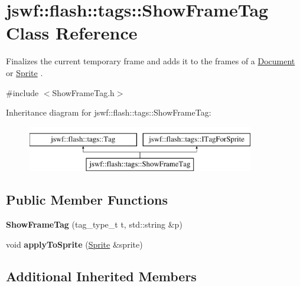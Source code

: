 \hypertarget{classjswf_1_1flash_1_1tags_1_1_show_frame_tag}{\section{jswf\+:\+:flash\+:\+:tags\+:\+:Show\+Frame\+Tag Class Reference}
\label{classjswf_1_1flash_1_1tags_1_1_show_frame_tag}
}


Finalizes the current temporary frame and adds it to the {\ttfamily frames} of a \hyperlink{classjswf_1_1flash_1_1_document}{Document} or \hyperlink{classjswf_1_1flash_1_1_sprite}{Sprite} .  




{\ttfamily \#include $<$Show\+Frame\+Tag.\+h$>$}

Inheritance diagram for jswf\+:\+:flash\+:\+:tags\+:\+:Show\+Frame\+Tag\+:\begin{figure}[H]
\begin{center}
\leavevmode
\includegraphics[height=2.000000cm]{classjswf_1_1flash_1_1tags_1_1_show_frame_tag}
\end{center}
\end{figure}
\subsection*{Public Member Functions}
\begin{DoxyCompactItemize}
\item 
\hypertarget{classjswf_1_1flash_1_1tags_1_1_show_frame_tag_a8c26fbb9abed3ff22feed31e847e9dc8}{{\bfseries Show\+Frame\+Tag} (tag\+\_\+type\+\_\+t t, std\+::string \&p)}\label{classjswf_1_1flash_1_1tags_1_1_show_frame_tag_a8c26fbb9abed3ff22feed31e847e9dc8}

\item 
\hypertarget{classjswf_1_1flash_1_1tags_1_1_show_frame_tag_a1b9f3731111416f40119fbdef56a4b5a}{void {\bfseries apply\+To\+Sprite} (\hyperlink{classjswf_1_1flash_1_1_sprite}{Sprite} \&sprite)}\label{classjswf_1_1flash_1_1tags_1_1_show_frame_tag_a1b9f3731111416f40119fbdef56a4b5a}

\end{DoxyCompactItemize}
\subsection*{Additional Inherited Members}


